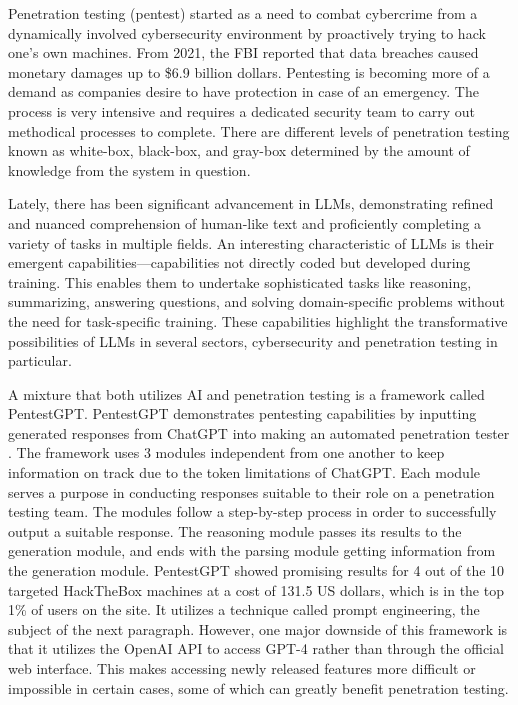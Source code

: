 \documentclass[conference]{IEEEtran}
\begin{document}
Penetration testing (pentest) started as a need to combat cybercrime from a dynamically involved cybersecurity environment by proactively trying to hack one's own machines\cite{deng2023pentestgpt}. From 2021, the FBI reported that data breaches caused monetary damages up to \$6.9 billion dollars\cite{heim2023convergence}.  Pentesting is becoming more of a demand as companies desire to have protection in case of an emergency. The process is very intensive and requires a dedicated security team to carry out methodical processes to complete\cite{applebaum2017analysis}. There are different levels of penetration testing known as white-box, black-box, and gray-box determined by the amount of knowledge from the system in question\cite{deng2023pentestgpt}.

Lately, there has been significant advancement in LLMs, demonstrating refined and nuanced comprehension of human-like text and proficiently completing a variety of tasks in multiple fields\cite{zhao2023survey}\cite{liu2023summary}. An interesting characteristic of LLMs is their emergent capabilities—capabilities not directly coded but developed during training\cite{wei2022emergent}. This enables them to undertake sophisticated tasks like reasoning, summarizing, answering questions, and solving domain-specific problems without the need for task-specific training. These capabilities highlight the transformative possibilities of LLMs in several sectors, cybersecurity and penetration testing in particular.

A mixture that both utilizes AI and penetration testing is a framework called PentestGPT\cite{heim2023convergence}. PentestGPT demonstrates pentesting capabilities by inputting generated responses from ChatGPT into making an automated penetration tester \cite{deng2023pentestgpt}. The framework uses 3 modules independent from one another to keep information on track due to the token limitations of ChatGPT. Each module serves a purpose in conducting responses suitable to their role on a penetration testing team. The modules follow a step-by-step process in order to successfully output a suitable response. The reasoning module passes its results to the generation module, and ends with the parsing module getting information from the generation module. PentestGPT showed promising results for 4 out of the 10 targeted HackTheBox\cite{hackthebox} machines at a cost of 131.5 US dollars, which is in the top 1\% of users on the site. It utilizes a technique called prompt engineering, the subject of the next paragraph\cite{white2023prompt}. However, one major downside of this framework is that it utilizes the OpenAI API to access GPT-4 rather than through the official web interface. This makes accessing newly released features more difficult or impossible in certain cases, some of which can greatly benefit penetration testing.
\end{document}
